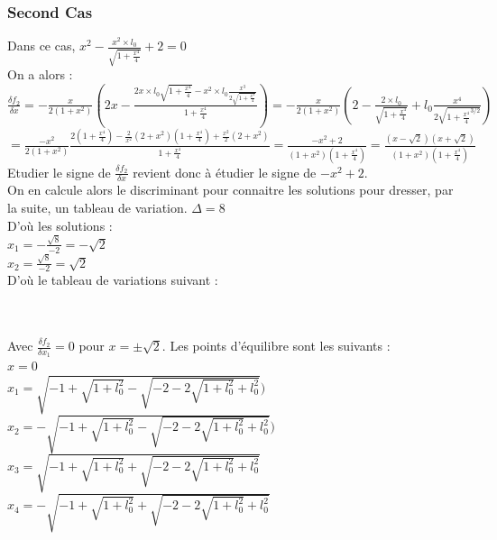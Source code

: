\documentclass[10pt,a4paper]{article}
\begin{document}
\subsubsection*{Second Cas}
Dans ce cas, $x^2-\frac{x^2\times l_0}{\sqrt{1+\frac{x^4}{4}}}+2=0$\\
On a alors :\\
$\frac{\delta f_2}{\delta x}=-\frac{x}{2(1+x^2)}(2x-\frac{2x\times l_0\sqrt{1+\frac{x^4}{4}}-x^2\times l_0\frac{x^3}{2\sqrt{1+\frac{x^4}{4}}}}{1+\frac{x^4}{4}})=
-\frac{x}{2(1+x^2)}(2-\frac{2\times l_0}{\sqrt{1+\frac{x^4}{4}}}+l_0\frac{x^4}{2\sqrt{1+\frac{x^4}{4}^{3/2}}})$\\$= \frac{-x^2}{2(1+x^2)}\frac{2(1+\frac{x^4}{4})-\frac{2}{x^2}(2+x^2)(1+\frac{x^4}{4})+\frac{x^2}{2}(2+x^2)}{1+\frac{x^4}{4}}=\frac{-x^2+2}{(1+x^2)(1+\frac{x^4}{4})}=\frac{(x-\sqrt{2})(x+\sqrt{2})}{(1+x^2)(1+\frac{x^4}{4})}$\\
Etudier le signe de $\frac{\delta f_2}{\delta x}$ revient donc à étudier le signe de $-x^2+2$.\\
On en calcule alors le discriminant pour connaitre les solutions pour dresser, par la suite, un tableau de variation.
$\Delta = 8$\\
D'où les solutions :\\
$x_1 = -\frac{\sqrt{8}}{-2} = -\sqrt{2}$\\
$x_2 = \frac{\sqrt{8}}{-2} = \sqrt{2}$\\
D'où le tableau de variations suivant :\\
\\
\\
Avec $\frac{\delta f_2}{\delta x_1}=0$ pour $x=\pm \sqrt{2}$.
Les points d'équilibre sont les suivants :\\
$x=0$\\
$x_1=\sqrt{-1+\sqrt{1+l_0^2}-\sqrt{-2-2\sqrt{1+l_0^2}+l_0^2}})$\\
$x_2=-\sqrt{-1+\sqrt{1+l_0^2}-\sqrt{-2-2\sqrt{1+l_0^2}+l_0^2}})$\\
$x_3=\sqrt{-1+\sqrt{1+l_0^2}+\sqrt{-2-2\sqrt{1+l_0^2}+l_0^2}}$\\
$x_4=-\sqrt{-1+\sqrt{1+l_0^2}+\sqrt{-2-2\sqrt{1+l_0^2}+l_0^2}}$\\
\end{document}
